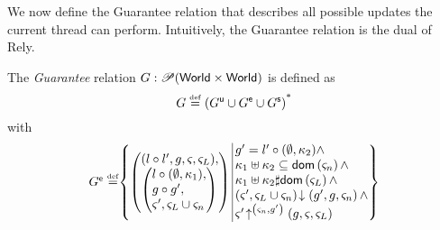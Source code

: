 We now define the Guarantee relation  that describes all possible updates the current thread can perform. Intuitively, the Guarantee relation is the dual of Rely.
%
\begin{definition}[Guarantee]
The \emph{Guarantee} relation $G: \mathscr{P} (\textsf{World} \times \textsf{World})$ is defined as
%
\[
	G \mathrel{\stackrel{\smash{\scriptscriptstyle{\mathrm{def}}}}{=}}  \left( G^{\textsf{u}} \cup G^{\textsf{e}} \cup G^{\textsf{s}} \right)^{\text{*}}
\]
%
with
%
\[
\begin{array}{@{} r @{} l @{}}

	\extendG \eqdef &
 	\left\{
	\begin{array}{@{} l @{\hspace*{2pt}} | @{\hspace*{2pt}} r @{}}
	   \left(
	   \begin{array}{@{} l @{}}
	     (l \composeL l', g, \amod{}, \amod{L}),\\
 	     \left(
	     \begin{array}{@{} l @{}}
	      l \composeL (\unitH, \ca{1}),\\
	      g \composeL g',\\
	      \amod{}', \amod{L} \cup \amod{n}
	     \end{array}
 	    \right)
	   \end{array}
 	  \right)
	   &
 	  	\begin{array}{@{} l @{}}
	 	  	g' = l' \composeL (\unitH, \ca{2})  \land\\
	 	  	
	 	  	\ca{1} \composeCap \ca{2} \subseteq \dom{\amod{n}} \land \\
	 	  	
	 	  	\ca{1} \composeCap \ca{2} \disjoint \dom{\amod{L}} \land \\
	 	  	
			\extendsAM{\amod{}', \amod{L} \cup \amod{n}}{g'}{g}{\amod{n}} \land \\
			

			\expandsAM{\amod{}'}{\amod{n}}{g'}{g}{\amod{}}{\amod{L}}
			
     	
   		\end{array}
 	\end{array}
	\right\}\\
	

\end{array}\]
\end{definition}
